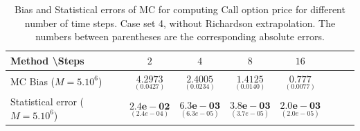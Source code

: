 \documentclass[11pt]{article}
\begin{document}
\begin{table}[h!]
\centering
\begin{tabular}{l*{6}{c}r}
Method \textbackslash  Steps            & $2$ & $4$ & $8$ & $16$  \\
\hline
MC Bias ($M=5.10^6$)   & 	$ \underset{(0.0427)}{\mathbf{4.2973}}$  & $\underset{(  0.0234)}{\mathbf{  2.4005}}$  & $\underset{(    0.0140)}{\mathbf{1.4125}}$ & $\underset{(
	0.0077)}{\mathbf{0.777}}$\\ 

Statistical error ($M=5.10^6$)  &  $\underset{(2.4e-04)} {\mathbf{2.4e-02}}$  & $\underset{(6.3e-05)} {\mathbf{6.3e-03}}$  & $\underset{(3.7e-05)} {\mathbf{3.8e-03}}$ & $\underset{(2.0e-05)} {\mathbf{2.0e-03}}$	\\



\hline
\end{tabular}
\caption{Bias and Statistical errors of MC  for computing Call option price  for different number of time steps. Case set 4, without Richardson extrapolation. The numbers between parentheses are the corresponding absolute errors.}
\label{Bias and Statistical errors of MC ($M=10^6$)  for computing Call option price  for different number of time steps. Case set 4, without Richardson extrapolation. The numbers between parentheses are the corresponding absolute errors.}
\end{table}
\end{document}
